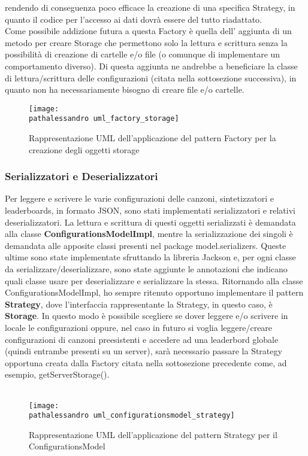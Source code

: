 \documentclass[a4paper,12pt]{report}
\newcommand\pathalessandro{img/alessandro/}
\begin{document}
rendendo di conseguenza poco efficace la creazione di una specifica Strategy, in quanto il codice per l'accesso ai dati dovrà
essere del tutto riadattato. \\
Come possibile addizione futura a questa Factory è quella dell' aggiunta di un metodo per creare Storage che permettono solo la lettura e scrittura
senza la possibilità di creazione di cartelle e/o file (o comunque di implementare un comportamento diverso). Di questa aggiunta ne andrebbe a 
beneficiare la classe di lettura/scrittura delle configurazioni (citata nella sottosezione successiva), in quanto non ha necessariamente bisogno 
di creare file e/o cartelle.
\begin{figure}[!htb]
	\centerline{\texttt{[image: \\pathalessandro uml\_factory\_storage]}}
	\caption{Rappresentazione UML dell'applicazione del pattern Factory per la creazione degli oggetti storage}
	\label{img:uml_factory_storage}
\end{figure}
\clearpage
\subsubsection{Serializzatori e Deserializzatori}
Per leggere e scrivere le varie configurazioni delle canzoni, sintetizzatori e leaderboards, in formato JSON, 
sono stati implementati serializzatori e relativi deserializzatori. La lettura e scrittura di questi oggetti 
serializzati è demandata alla classe \textbf{ConfigurationsModelImpl}, mentre la serializzazione dei singoli è demandata alle apposite classi presenti
nel package model.serializers. Queste ultime sono state implementate sfruttando la libreria Jackson e, per ogni classe da serializzare/deserializzare, sono state aggiunte le annotazioni che indicano
quali classe usare per deserializzare e serializzare la stessa.
Ritornando alla classe ConfigurationsModelImpl, ho sempre ritenuto opportuno implementare il pattern \textbf{Strategy}, dove l'interfaccia rappresentante
la Strategy, in questo caso, è \textbf{Storage}.
In questo modo è possibile scegliere se dover leggere e/o scrivere in locale le configurazioni oppure, nel caso in futuro si voglia leggere/creare
configurazioni di canzoni preesistenti e accedere ad una leaderbord globale (quindi entrambe presenti su un server), sarà necessario passare la Strategy
opportuna creata dalla Factory citata nella sottosezione precedente come, ad esempio, getServerStorage(). \\ \\
\begin{figure}[!htb]
	\centerline{\texttt{[image: \\pathalessandro uml\_configurationsmodel\_strategy]}}
	\caption{Rappresentazione UML dell'applicazione del pattern Strategy per il ConfigurationsModel}
	\label{img:uml_configurationsmodel_strategy}
\end{figure}
\clearpage \hfill\break
\end{document}
